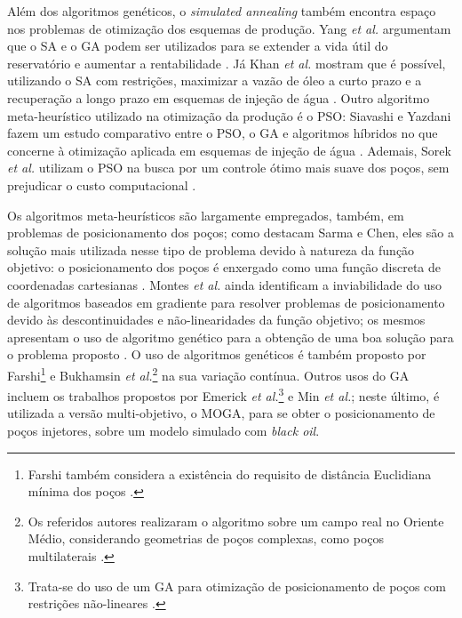 Al\'{e}m dos algoritmos gen\'{e}ticos, o \textit{simulated annealing} tamb\'{e}m encontra espa\c{c}o nos problemas de otimiza\c{c}\~{a}o dos esquemas de produ\c{c}\~{a}o. Yang \textit{et al.} argumentam que o SA e o GA podem ser utilizados para se extender a vida \'{u}til do reservat\'{o}rio e aumentar a rentabilidade \cite{YANG200369}. J\'{a} Khan \textit{et al.} mostram que \'{e} poss\'{i}vel, utilizando o SA com restri\c{c}\~{o}es, maximizar a vaz\~{a}o de \'{o}leo a curto prazo e a recupera\c{c}\~{a}o a longo prazo em esquemas de inje\c{c}\~{a}o de \'{a}gua \cite{khanSA}. Outro algoritmo meta-heur\'{i}stico utilizado na otimiza\c{c}\~{a}o da produ\c{c}\~{a}o \'{e} o PSO: Siavashi e Yazdani fazem um estudo comparativo entre o PSO, o GA e algoritmos h\'{i}bridos no que concerne \`{a} otimiza\c{c}\~{a}o aplicada em esquemas de inje\c{c}\~{a}o de \'{a}gua \cite{siavashiPSO}. Ademais, Sorek \textit{et al.} utilizam o PSO na busca por um controle \'{o}timo mais suave dos po\c{c}os, sem prejudicar o custo computacional \cite{Sorek2017}.

Os algoritmos meta-heur\'{i}sticos s\~{a}o largamente empregados, tamb\'{e}m, em problemas de posicionamento dos po\c{c}os; como destacam Sarma e Chen, eles s\~{a}o a solu\c{c}\~{a}o mais utilizada nesse tipo de problema devido \`{a} natureza da fun\c{c}\~{a}o objetivo: o posicionamento dos po\c{c}os \'{e} enxergado como uma fun\c{c}\~{a}o discreta de coordenadas cartesianas \cite{sarmaChen}. Montes \textit{et al.} ainda identificam a inviabilidade do uso de algoritmos baseados em gradiente para resolver problemas de posicionamento devido \`{a}s descontinuidades e n\~{a}o-linearidades da fun\c{c}\~{a}o objetivo; os mesmos apresentam o uso de algoritmo gen\'{e}tico para a obten\c{c}\~{a}o de uma boa solu\c{c}\~{a}o para o problema proposto \cite{montesETAL}. O uso de algoritmos gen\'{e}ticos \'{e} tamb\'{e}m proposto por Farshi\footnote{Farshi tamb\'{e}m considera a exist\^{e}ncia do requisito de dist\^{a}ncia Euclidiana m\'{i}nima dos po\c{c}os \cite{farshi}.} e Bukhamsin \textit{et al.}\footnote{Os referidos autores realizaram o algoritmo sobre um campo real no Oriente M\'{e}dio, considerando geometrias de po\c{c}os complexas, como po\c{c}os multilaterais \cite{bukhamsin}.} na sua varia\c{c}\~{a}o cont\'{i}nua. Outros usos do GA incluem os trabalhos propostos por Emerick \textit{et al.}\footnote{Trata-se do uso de um GA para otimiza\c{c}\~{a}o de posicionamento de po\c{c}os com restri\c{c}\~{o}es n\~{a}o-lineares \cite{emerick}.} e Min \textit{et al.}; neste \'{u}ltimo, \'{e} utilizada a vers\~{a}o multi-objetivo, o MOGA, para se obter o posicionamento de po\c{c}os injetores, sobre um modelo simulado com \textit{black oil}. 

